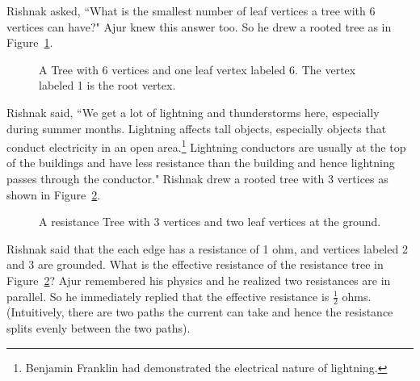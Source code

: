 Rishnak asked, ``What is the smallest number of leaf vertices a tree with 6 vertices can have?" Ajur knew this answer too. So he drew a rooted tree as in Figure~\ref{t2}.

\begin{figure}
\begin{center}

\caption{A Tree with 6 vertices and one leaf vertex labeled 6. The vertex labeled 1 is the root vertex.}\label{t2}
\end{center}
\end{figure}

Rishnak said, ``We get a lot of lightning and thunderstorms here, especially during summer months. Lightning affects tall objects, especially objects that conduct electricity in an open area.\footnote{Benjamin Franklin had demonstrated the electrical nature of lightning.} Lightning conductors are usually at the top of the buildings and have less resistance than the building and hence lightning passes through the conductor." Rishnak drew a rooted tree with 3 vertices as shown in Figure~\ref{t3}.

\begin{figure}
\begin{center}


\caption{A resistance  Tree with 3 vertices and two leaf vertices at the ground. }\label{t3}
\end{center}
\end{figure}


Rishnak said that the each edge has a resistance of 1 ohm, and vertices labeled 2 and 3 are grounded. What is the effective resistance of the resistance tree in Figure~\ref{t3}? Ajur remembered his physics and he realized two resistances are in parallel. So he immediately replied that the effective resistance is $\frac{1}{2}$ ohms. (Intuitively, there are two paths the current can take and hence the resistance splits evenly between the two paths).

